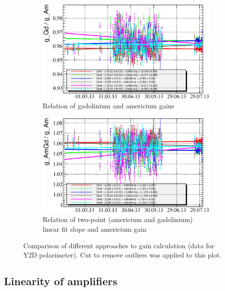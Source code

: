 \documentclass[a4paper,12pt]{article}
\begin{document}
\newcommand\gainrealationslabel{Comparison of different approaches to gain calculation (data for Y2D polarimeter).
Cut to remove outliers was applied to this plot.}
\begin{figure}[p]
\begin{subfigure}[b]{0.5\textwidth}
\includegraphics[width=\textwidth]{gfx/run13_alpha_study/Y2U/c_chGdGain_over_AmGain_by_day_Y2U.eps}
\caption{Relation of gadolinium and americium gains}
\end{subfigure}
\begin{subfigure}[b]{0.5\textwidth}
\includegraphics[width=\textwidth]{gfx/run13_alpha_study/Y2U/c_chAmGdGain_over_AmGain_by_day_Y2U.eps}
\caption{Relation of two-point (americium and gadolinium) linear fit slope and americium gain}
\end{subfigure}
\caption{\gainrealationslabel}
\label{fig:gain_relations}
\end{figure}


\subsection{Linearity of amplifiers}
\end{document}
